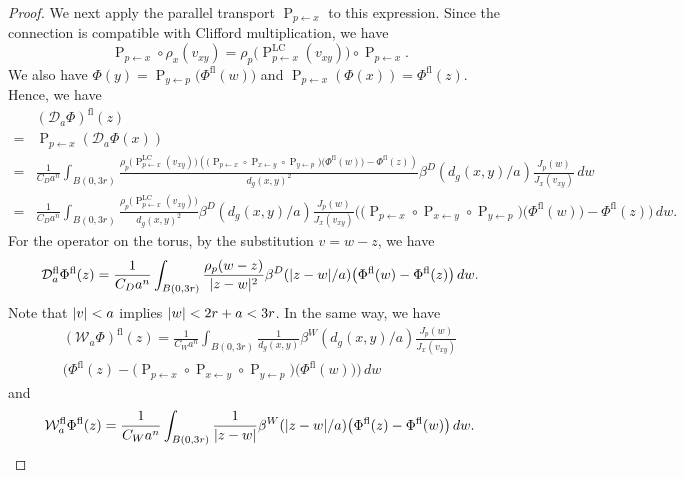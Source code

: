 \documentclass[a4paper,oneside,12pt]{amsart}
\theoremstyle{plain}
\theoremstyle{definition}
\theoremstyle{remark}
\DeclarePairedDelimiter{\abs}{\lvert}{\rvert}
\newcommand{\paralleltransport}[2]{\operatorname{P}_{#2 \gets #1}}
\newcommand{\paralleltransportLC}[2]{\paralleltransport{#1}{#2}^{\mathrm{LC}}}
\newcommand{\cliffordmultiplication}{\rho}
\newcommand{\mesoscopicDiracoperator}[1][a]{\mathcal{D}_{#1}}
\newcommand{\mesoscopicWilsonterm}[1][a]{\mathcal{W}_{#1}}
\newcommand{\cutoff}{\beta}
\newcommand{\cutoffDirac}{\cutoff^D}
\newcommand{\cutoffWilson}{\cutoff^W}
\newcommand{\flatmesoscopicDiracoperator}{\mesoscopicDiracoperator^{\mathrm{fl}}}
\newcommand{\flatmesoscopicWilsonterm}{\mesoscopicWilsonterm^{\mathrm{fl}}}
\newcommand{\flatmodel}[1]{#1^{\mathrm{fl}}}
\begin{document}
\begin{proof}
  We next apply the parallel transport $\paralleltransport{x}{p}$ to this expression.
  Since the connection is compatible with Clifford multiplication, we have
  \begin{equation}
    \paralleltransport{x}{p} \circ \cliffordmultiplication_x(v_{xy}) = \cliffordmultiplication_p \big(\paralleltransportLC{x}{p}(v_{xy})\big) \circ \paralleltransport{x}{p}.
  \end{equation}
  We also have $\Phi(y) = \paralleltransport{p}{y}\big(\flatmodel{\Phi}(w)\big)$ and $\paralleltransport{x}{p}(\Phi(x)) = \flatmodel{\Phi}(z)$.
  Hence, we have
  \begin{equation}
    \begin{aligned}
    & \flatmodel{\left(\mesoscopicDiracoperator \Phi\right)}(z) \\
    ={}& \paralleltransport{x}{p}\left(\mesoscopicDiracoperator \Phi(x)\right) \\
    ={}& \frac{1}{C_D a^n} \int_{B(0,3r)} \frac{\cliffordmultiplication_p \big(\paralleltransportLC{x}{p}(v_{xy})\big) \left( \big(\paralleltransport{x}{p} \circ \paralleltransport{y}{x} \circ \paralleltransport{p}{y}\big)\big(\flatmodel{\Phi}(w)\big) - \flatmodel{\Phi}(z) \right)}{d_g(x,y)^2} \cutoffDirac(d_g(x,y)/a) \frac{J_p(w)}{J_x(v_{xy})} \,dw \\
    ={}& \frac{1}{C_D a^n} \int_{B(0,3r)} \frac{\cliffordmultiplication_p \big(\paralleltransportLC{x}{p}(v_{xy})\big) }{d_g(x,y)^2} \cutoffDirac(d_g(x,y)/a) \frac{J_p(w)}{J_x(v_{xy})} \big( \big(\paralleltransport{x}{p} \circ \paralleltransport{y}{x} \circ \paralleltransport{p}{y}\big)\big(\flatmodel{\Phi}(w)\big) - \flatmodel{\Phi}(z) \big) \,dw. \label{equation: flat(D Phi)}
    \end{aligned}
  \end{equation}
  For the operator on the torus, by the substitution $v = w-z$, we have
  \begin{equation}\label{equation: flat D (flat Phi)}
    \flatmesoscopicDiracoperator \flatmodel{\Phi}(z) = \frac{1}{C_D a^n} \int_{B(0,3r)} \frac{\cliffordmultiplication_p(w-z)}{\abs{z-w}^2} \cutoffDirac(\abs{z-w}/a) \big(\flatmodel{\Phi}(w) - \flatmodel{\Phi}(z)\big) \,dw.
  \end{equation}
  Note that $\abs{v} < a$ implies $\abs{w} < 2r+a < 3r$.
  In the same way, we have
  \begin{multline}
    \flatmodel{\left(\mesoscopicWilsonterm \Phi\right)}(z) = \frac{1}{C_W a^n} \int_{B(0,3r)} \frac{1}{d_g(x,y)} \cutoffWilson(d_g(x,y)/a) \frac{J_p(w)}{J_x(v_{xy})} \\
    \big( \flatmodel{\Phi}(z) - \big(\paralleltransport{x}{p} \circ \paralleltransport{y}{x} \circ \paralleltransport{p}{y}\big)\big(\flatmodel{\Phi}(w)\big) \big) \,dw
  \end{multline}
  and
  \begin{equation}
    \flatmesoscopicWilsonterm \flatmodel{\Phi}(z) = \frac{1}{C_W a^n} \int_{B(0,3r)} \frac{1}{\abs{z-w}} \cutoffWilson(\abs{z-w}/a) \big(\flatmodel{\Phi}(z) - \flatmodel{\Phi}(w)\big)\,dw.
  \end{equation}


\end{proof}
\end{document}
